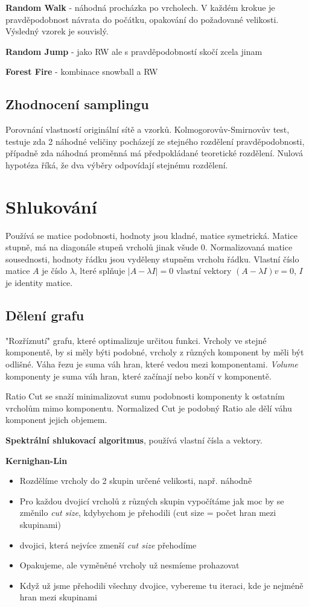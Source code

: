 \documentclass[a4paper,12pt]{article}
\begin{document}
\textbf{Random Walk} - náhodná procházka po vrcholech. V každém krokue je pravděpodobnost návrata do počátku, opakování do požadované velikosti. Výsledný vzorek je souvislý.

\textbf{Random Jump} - jako RW ale s pravděpodobností skočí zcela jinam

\textbf{Forest Fire} - kombinace snowball a RW

\subsection{Zhodnocení samplingu}
Porovnání vlastností originální sítě  a vzorků. Kolmogorovův-Smirnovův test, testuje zda 2 náhodné veličiny pocházejí ze stejného rozdělení pravděpodobnosti,
případně zda náhodná proměnná má předpokládané teoretické rozdělení. Nulová hypotéza říká, že dva výběry odpovídají stejnému rozdělení.

\section{Shlukování}
Používá se matice podobnosti, hodnoty jsou kladné, matice symetrická. Matice stupně, má na diagonále stupeň vrcholů jinak všude 0.
Normalizovaná matice sousednosti, hodnoty řádku jsou vyděleny stupněm vrcholu řádku. Vlastní číslo matice $A$ je číslo $\lambda$, lteré splňuje
$|A-\lambda I| = 0$ vlastní vektory $(A-\lambda I)v = 0$, $I$ je identity matice.

\subsection{Dělení grafu}
"Rozříznutí" grafu, které optimalizuje určitou funkci. Vrcholy ve stejné komponentě, by si měly býti podobné, vrcholy z různých komponent by měli být odlišné.
Váha řezu je suma váh hran, které vedou mezi komponentami. \emph{Volume} komponenty je suma váh hran, které začínají nebo končí v komponentě.

Ratio Cut se snaží minimalizovat sumu podobnosti komponenty k ostatním vrcholům mimo komponentu. Normalized Cut je podobný Ratio ale dělí váhu komponent jejich objemem.

\textbf{Spektrální shlukovací algoritmus}, používá vlastní čísla a vektory.

\textbf{Kernighan-Lin}
\begin{itemize}
    \item Rozdělíme vrcholy do 2 skupin určené velikosti, např. náhodně
    \item Pro každou dvojicí vrcholů z různých skupin vypočítáme jak moc by se změnilo \emph{cut size}, kdybychom je přehodili (cut size = počet hran mezi skupinami)
    \item dvojici, která nejvíce zmenší \emph{cut size} přehodíme
    \item Opakujeme, ale vyměněné vrcholy už nesmíeme prohazovat
    \item Když už jsme přehodili všechny dvojice, vybereme tu iteraci, kde je nejméně hran mezi skupinami
\end{itemize}
\end{document}
